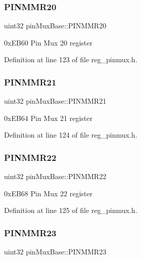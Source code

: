 \subsubsection{\texorpdfstring{P\+I\+N\+M\+M\+R20}{PINMMR20}}
{\footnotesize\ttfamily uint32 pin\+Mux\+Base\+::\+P\+I\+N\+M\+M\+R20}

0x\+E\+B60 Pin Mux 20 register 

Definition at line 123 of file reg\+\_\+pinmux.\+h.

\mbox{\label{structpinMuxBase_aad731a1c0af21d7eb3e43100da7b0979}} 
\subsubsection{\texorpdfstring{P\+I\+N\+M\+M\+R21}{PINMMR21}}
{\footnotesize\ttfamily uint32 pin\+Mux\+Base\+::\+P\+I\+N\+M\+M\+R21}

0x\+E\+B64 Pin Mux 21 register 

Definition at line 124 of file reg\+\_\+pinmux.\+h.

\mbox{\label{structpinMuxBase_a89ad55782ac1a5ce10d51ccf0b8b80b6}} 
\subsubsection{\texorpdfstring{P\+I\+N\+M\+M\+R22}{PINMMR22}}
{\footnotesize\ttfamily uint32 pin\+Mux\+Base\+::\+P\+I\+N\+M\+M\+R22}

0x\+E\+B68 Pin Mux 22 register 

Definition at line 125 of file reg\+\_\+pinmux.\+h.

\mbox{\label{structpinMuxBase_acd7a53a0e987e04e0e392f5fa342f8d3}} 
\subsubsection{\texorpdfstring{P\+I\+N\+M\+M\+R23}{PINMMR23}}
{\footnotesize\ttfamily uint32 pin\+Mux\+Base\+::\+P\+I\+N\+M\+M\+R23}

